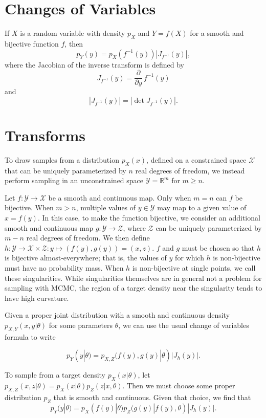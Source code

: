 \documentclass[11pt]{article}
\newcommand{\abs}[1]{\left| #1 \right|}
\newcommand{\absdet}[1]{\abs{#1}}
\begin{document}
\section{Changes of Variables}

If $X$ is a random variable with density $p_X$ and $Y = f(X)$ for a
smooth and bijective function $f$, then
\[
  p_Y(y) = p_X(f^{-1}(y)) \absdet{J_{f^{-1}}(y)},
\]
where the Jacobian of the inverse transform is defined by
\[
  J_{f^{-1}}(y) = \frac{\partial}{\partial y} \, f^{-1}(y)
\]
and
\[
  \absdet{J_{f^{-1}}(y)}
  = \abs{\det J_{f^{-1}}(y)}.
\]

\section{Transforms}

To draw samples from a distribution $p_X(x)$, defined on a constrained space $\mathcal{X}$ that can be uniquely parameterized by $n$ real degrees of freedom, we instead perform sampling in an unconstrained space $\mathcal{Y}=\mathbb{R}^m$ for $m \ge n$.

Let $f\colon \mathcal{Y} \to \mathcal{X}$ be a smooth and continuous map.
Only when $m = n$ can $f$ be bijective.
When $m > n$, multiple values of $y \in \mathcal{Y}$ may map to a given value of $x = f(y)$.
In this case, to make the function bijective, we consider an additional smooth and continuous map $g\colon \mathcal{Y} \to \mathcal{Z}$, where $\mathcal{Z}$ can be uniquely parameterized by $m - n$ real degrees of freedom.
We then define $h\colon \mathcal{Y} \to \mathcal{X} \times \mathcal{Z}: y \mapsto (f(y), g(y)) = (x, z)$.
$f$ and $g$ must be chosen so that $h$ is bijective almost-everywhere;
that is, the values of $y$ for which $h$ is non-bijective must have no probability mass.
When $h$ is non-bijective at single points, we call these singularities.
While singularities themselves are in general not a problem for sampling with MCMC, the region of a target density near the singularity tends to have high curvature.

Given a proper joint distribution with a smooth and continuous density $p_{X,Y}(x, y | \theta)$ for some parameters $\theta$, we can use the usual change of variables formula to write

\[
  p_Y(y | \theta) = p_{X,Z}(f(y), g(y) | \theta) |J_h(y)|.
\]

To sample from a target density $p_X(x | \theta)$, let $p_{X,Z}(x, z | \theta) = p_X(x | \theta) p_Z(z | x, \theta)$.
Then we must choose some proper distribution $p_Z$ that is smooth and continuous.
Given that choice, we find that
\[
  p_Y(y | \theta) = p_X(f(y) | \theta) p_Z(g(y) | f(y), \theta) |J_h(y)|.
\]
\end{document}
